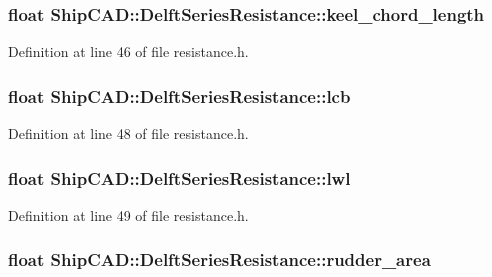 \hypertarget{structShipCAD_1_1DelftSeriesResistance_a986244b5c6944f01dbdae5d54b895c84}{
\subsubsection[{keel\-\_\-chord\-\_\-length}]{\setlength{\rightskip}{0pt plus 5cm}float Ship\-C\-A\-D\-::\-Delft\-Series\-Resistance\-::keel\-\_\-chord\-\_\-length}}\label{structShipCAD_1_1DelftSeriesResistance_a986244b5c6944f01dbdae5d54b895c84}


Definition at line 46 of file resistance.\-h.

\hypertarget{structShipCAD_1_1DelftSeriesResistance_aca93b2c11316e29b2f98a3bdcdf65bc5}{
\subsubsection[{lcb}]{\setlength{\rightskip}{0pt plus 5cm}float Ship\-C\-A\-D\-::\-Delft\-Series\-Resistance\-::lcb}}\label{structShipCAD_1_1DelftSeriesResistance_aca93b2c11316e29b2f98a3bdcdf65bc5}


Definition at line 48 of file resistance.\-h.

\hypertarget{structShipCAD_1_1DelftSeriesResistance_a7232b8ea3003087a4772a650319ec8f2}{
\subsubsection[{lwl}]{\setlength{\rightskip}{0pt plus 5cm}float Ship\-C\-A\-D\-::\-Delft\-Series\-Resistance\-::lwl}}\label{structShipCAD_1_1DelftSeriesResistance_a7232b8ea3003087a4772a650319ec8f2}


Definition at line 49 of file resistance.\-h.

\hypertarget{structShipCAD_1_1DelftSeriesResistance_a9737974d43a292c58a2e24f7c78c1ffb}{
\subsubsection[{rudder\-\_\-area}]{\setlength{\rightskip}{0pt plus 5cm}float Ship\-C\-A\-D\-::\-Delft\-Series\-Resistance\-::rudder\-\_\-area}}\label{structShipCAD_1_1DelftSeriesResistance_a9737974d43a292c58a2e24f7c78c1ffb}


